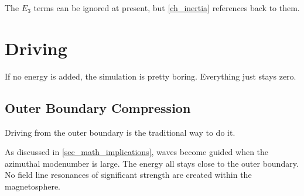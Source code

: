 The $E_3$ terms can be ignored at present, but \cref{ch_inertia} references back to them. 















\section{Driving}
  \label{sec_driving}

If no energy is added, the simulation is pretty boring. Everything just stays zero. 

\subsection{Outer Boundary Compression}

Driving from the outer boundary is the traditional way to do it. 


As discussed in \cref{sec_math_implications}, \Alfven waves become guided when the azimuthal modenumber is large. The energy all stays close to the outer boundary. No field line resonances of significant strength are created within the magnetosphere. 


